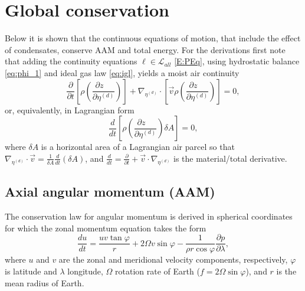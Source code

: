 \documentclass{agujournal}
\begin{document}
{\section{Global conservation}\label{app:conservation}
Below it is shown that the continuous equations of motion, that include the effect of condensates, conserve AAM and total energy. For the derivations first note that adding the continuity equations $\ell \in \mathcal{L}_{all} $ \eqref{E:PEq}, using hydrostatic balance \eqref{eq:phi_1} and ideal gas law \eqref{eq:igl}, yields a moist air continuity
\begin{equation}
\frac{\partial }{\partial t}\left[ \rho \left(\frac{\partial z\quad}{\partial \eta^{(d)}}\right)\right]+\nabla_{\eta^{(d)}} \cdot \left[ \vec{v}\rho  \left( \frac{\partial z\quad }{\partial \eta^{(d)}}\right)\right]=0,\label{eq:cont2}
\end{equation}
or, equivalently, in Lagrangian form
\begin{equation}
\frac{d}{dt}\left[ \rho \left( \frac{\partial z\quad }{\partial \eta^{(d)}}\right)\delta A\right]=0,\label{eq:lagra_cont}
\end{equation}
where $\delta A$ is a horizontal area of a Lagrangian air parcel so that $\nabla_{\eta^{(d)}} \cdot \vec{v}=\frac{1}{\delta A}\frac{d}{dt}\left( \delta A\right)$, and  $\frac{d}{dt}=\frac{\partial }{\partial t}+\vec{v}\cdot \nabla_{\eta^{(d)}} $ is the material/total derivative. 
\subsection{Axial angular momentum (AAM)}
The conservation law for angular momentum is derived in spherical coordinates for which the zonal momentum equation takes the form
\begin{equation}
\frac{du}{dt}=\frac{u v \tan \varphi}{r}+2\Omega v\sin \varphi -\frac{1}{\rho r \cos \varphi}\frac{\partial p}{\partial \lambda},\label{eq:tmp200}
\end{equation}
where $u$ and $v$ are the zonal and meridional velocity components, respectively, $\varphi$ is latitude and $\lambda$ longitude, $\Omega$ rotation rate of Earth ($f=2\Omega \sin \varphi$), and $r$ is the mean radius of Earth.\\

}
\end{document}
